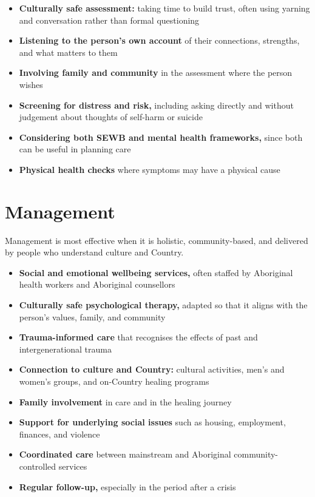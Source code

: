 \begin{itemize}
    \item \textbf{Culturally safe assessment:} taking time to build trust, often using yarning and conversation rather than formal questioning
    \item \textbf{Listening to the person's own account} of their connections, strengths, and what matters to them
    \item \textbf{Involving family and community} in the assessment where the person wishes
    \item \textbf{Screening for distress and risk,} including asking directly and without judgement about thoughts of self-harm or suicide
    \item \textbf{Considering both SEWB and mental health frameworks,} since both can be useful in planning care
    \item \textbf{Physical health checks} where symptoms may have a physical cause
\end{itemize}

\section*{Management}
Management is most effective when it is holistic, community-based, and delivered by people who understand culture and Country.

\begin{itemize}
    \item \textbf{Social and emotional wellbeing services,} often staffed by Aboriginal health workers and Aboriginal counsellors
    \item \textbf{Culturally safe psychological therapy,} adapted so that it aligns with the person's values, family, and community
    \item \textbf{Trauma-informed care} that recognises the effects of past and intergenerational trauma
    \item \textbf{Connection to culture and Country:} cultural activities, men's and women's groups, and on-Country healing programs
    \item \textbf{Family involvement} in care and in the healing journey
    \item \textbf{Support for underlying social issues} such as housing, employment, finances, and violence
    \item \textbf{Coordinated care} between mainstream and Aboriginal community-controlled services
    \item \textbf{Regular follow-up,} especially in the period after a crisis
\end{itemize}

